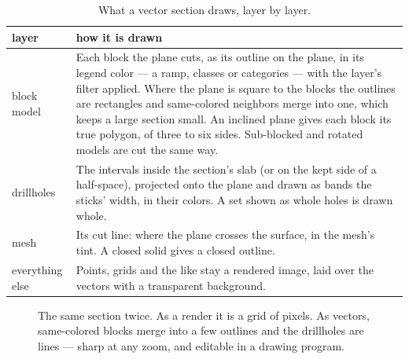 \begin{table}[htbp]\small
\begin{tabularx}{\linewidth}{@{}lL@{}}\toprule
layer & how it is drawn \\ \midrule
block model & Each block the plane cuts, as its outline on the plane, in its legend color — a ramp, classes or categories — with the layer's filter applied. Where the plane is square to the blocks the outlines are rectangles and same-colored neighbors merge into one, which keeps a large section small. An inclined plane gives each block its true polygon, of three to six sides. Sub-blocked and rotated models are cut the same way. \\
drillholes & The intervals inside the section's slab (or on the kept side of a half-space), projected onto the plane and drawn as bands the sticks' width, in their colors. A set shown as whole holes is drawn whole. \\
mesh & Its cut line: where the plane crosses the surface, in the mesh's tint. A closed solid gives a closed outline. \\
everything else & Points, grids and the like stay a rendered image, laid over the vectors with a transparent background. \\ \bottomrule
\end{tabularx}
\caption{What a vector section draws, layer by layer.}\label{tab:compo-vector}
\end{table}

\begin{figure}[htbp]\centering
{}
\caption{The same section twice. As a render it is a grid of pixels. As vectors, same-colored blocks merge into a few outlines and the drillholes are lines — sharp at any zoom, and editable in a drawing program.}\label{fig:compo-vector-diagram}
\end{figure}

